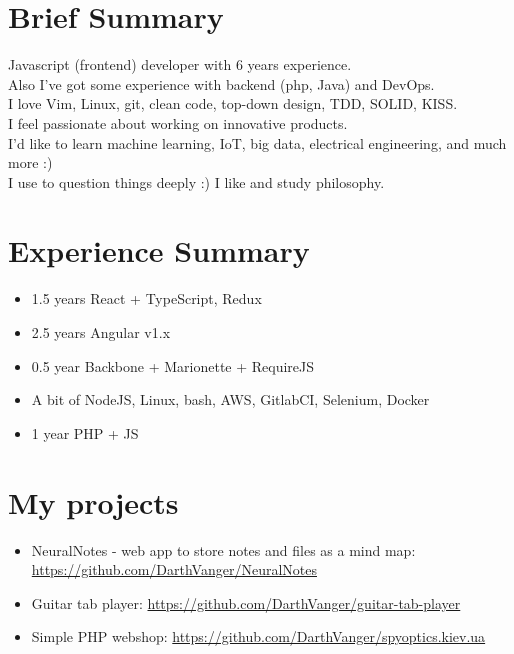 \documentclass[a4paper, 14pt]{article}
\begin{document}
\begin{center}
	\textsc{\Huge{}}
\end{center}


\section{Brief Summary}
  Javascript (frontend) developer with 6 years experience.  \\
  Also I've got some experience with backend (php, Java) and DevOps.  \\
  I love Vim, Linux, git, clean code, top-down design, TDD, SOLID, KISS. \\
  I feel passionate about working on innovative products. \\
  I'd like to learn machine learning, IoT, big data, electrical engineering, and much more :) \\
  I use to question things deeply :) I like and study philosophy. \\

\section{Experience Summary}
  \begin{itemize}
    \item 1.5 years React + TypeScript, Redux \\
    \item 2.5 years Angular v1.x \\ 
    \item 0.5 year Backbone + Marionette + RequireJS \\ 
    \item A bit of NodeJS, Linux, bash, AWS, GitlabCI, Selenium, Docker \\
    \item 1 year PHP + JS
  \end{itemize}

\section{My projects}
  \begin{itemize}
    \item NeuralNotes - web app to store notes and files as a mind map: \url{https://github.com/DarthVanger/NeuralNotes} \\
    \item Guitar tab player: \url{https://github.com/DarthVanger/guitar-tab-player} \\
    \item Simple PHP webshop: \url{https://github.com/DarthVanger/spyoptics.kiev.ua} \\
  \end{itemize}
\end{document}
